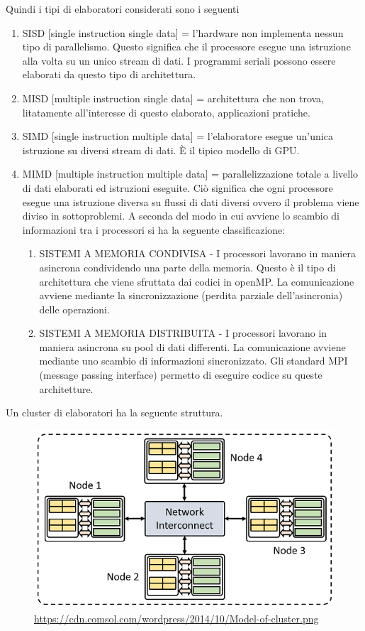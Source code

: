 \documentclass[italian]{article}
\begin{document}
Quindi i tipi di elaboratori considerati sono i seguenti
\begin{enumerate}
\item SISD [single instruction single data] = l'hardware non implementa nessun tipo di parallelismo. Questo significa che il processore esegue una istruzione alla volta su un unico stream di dati. I programmi seriali possono essere elaborati da questo tipo di architettura.
\item MISD [multiple instruction single data] = architettura che non trova, litatamente all'interesse di questo elaborato, applicazioni pratiche.
\item SIMD [single instruction multiple data] = l'elaboratore esegue un'unica istruzione su diversi stream di dati. È il tipico modello di GPU.
\item MIMD [multiple instruction multiple data] = parallelizzazione totale a livello di dati elaborati ed istruzioni eseguite.  Ciò significa che ogni processore esegue una istruzione diversa su flussi di dati diversi ovvero il problema viene diviso in sottoproblemi. A seconda del modo in cui avviene lo scambio di informazioni tra i processori si ha la seguente classificazione:
\begin{enumerate}
\item SISTEMI A MEMORIA CONDIVISA - I processori lavorano in maniera asincrona condividendo una parte della memoria. Questo è il tipo di architettura che viene sfruttata dai codici in openMP. La comunicazione avviene mediante la sincronizzazione (perdita parziale dell'asincronia) delle operazioni.
\item SISTEMI A MEMORIA DISTRIBUITA - I processori lavorano in maniera asincrona su pool di dati differenti. La comunicazione avviene mediante uno scambio di informazioni sincronizzato. Gli standard MPI (message passing interface) permetto di eseguire codice su queste architetture.
\end{enumerate}
\end{enumerate}

Un cluster di elaboratori ha la seguente struttura.
\begin{figure}[h!]
\centering
  \includegraphics[width=0.6\linewidth]{smp.png}
  \caption*{\tiny \url{https://cdn.comsol.com/wordpress/2014/10/Model-of-cluster.png}}
\end{figure}
\end{document}

